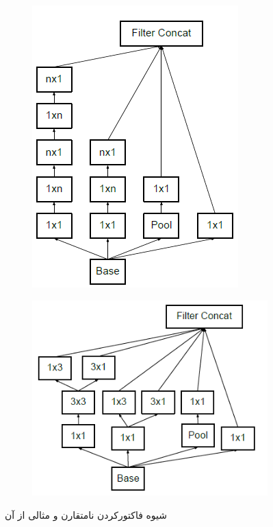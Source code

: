\documentclass[12pt, a4paper]{article}
\begin{document}
\begin{itemize}
    \begin{figure}[h]
        \begin{subfigure}{0.45\linewidth}
            \centering
            \includegraphics[scale=0.4]{images/inception/asymetric.png}
            \caption{}
            \label{asymetric_fact}
        \end{subfigure}
        \begin{subfigure}{0.45\linewidth}
            \centering
            \includegraphics[scale=0.4]{images/inception/asymetric_example.png}
            \caption{}
            \label{asymetric_example}
        \end{subfigure}
        \caption{شیوه فاکتورکردن نامتقارن و مثالی از آن}
    \end{figure}


\end{itemize}
\end{document}
